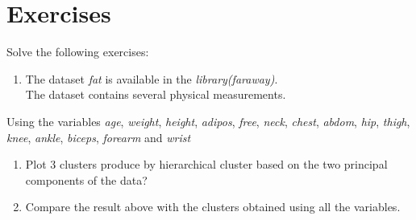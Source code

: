 \documentclass[
]{book}
\newenvironment{Shaded}{\begin{snugshade}}{\end{snugshade}}
\newcommand{\FloatTok}[1]{\textcolor[rgb]{0.00,0.00,0.81}{#1}}
\newcommand{\FunctionTok}[1]{\textcolor[rgb]{0.13,0.29,0.53}{\textbf{#1}}}
\newcommand{\NormalTok}[1]{#1}
\newcommand{\SpecialCharTok}[1]{\textcolor[rgb]{0.81,0.36,0.00}{\textbf{#1}}}
\providecommand{\tightlist}{%
  \setlength{\itemsep}{0pt}\setlength{\parskip}{0pt}}
\begin{document}
\begin{Shaded}
\end{Shaded}

\section{Exercises}\label{HC4}

Solve the following exercises:

\begin{enumerate}
\def\labelenumi{\arabic{enumi})}
\tightlist
\item
  The dataset \emph{fat} is available in the \emph{library(faraway)}.\\
  The dataset contains several physical measurements.
\end{enumerate}

Using the variables \emph{age}, \emph{weight}, \emph{height}, \emph{adipos}, \emph{free}, \emph{neck}, \emph{chest},
\emph{abdom}, \emph{hip}, \emph{thigh}, \emph{knee}, \emph{ankle}, \emph{biceps}, \emph{forearm} and \emph{wrist}

\begin{enumerate}
\def\labelenumi{\alph{enumi})}
\item
  Plot 3 clusters produce by hierarchical cluster based on the two
  principal components of the data?
\item
  Compare the result above with the
  clusters obtained using all the variables.
\end{enumerate}
\end{document}
